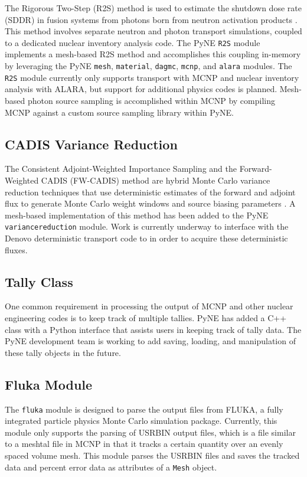 \documentclass{anstrans}
\newcommand{\Mesh}{\texttt{Mesh} }
\begin{document}
The Rigorous Two-Step (R2S) method is used to estimate the shutdown dose rate
(SDDR) in fusion systems from photons born from neutron activation products
\cite{chen_rigorous_2002}. This method involves separate neutron and photon
transport simulations, coupled to a dedicated nuclear inventory analysis code.
The PyNE \texttt{R2S} module implements a mesh-based R2S method and
accomplishes this coupling in-memory by leveraging the PyNE \texttt{mesh},
\texttt{material}, \texttt{dagmc}, \texttt{mcnp}, and \texttt{alara} modules.
The \texttt{R2S} module currently only supports transport with MCNP and nuclear
inventory analysis with ALARA, but support for additional physics codes is
planned. Mesh-based photon source sampling is accomplished within MCNP by
compiling MCNP against a custom source sampling library within PyNE.


\subsection{CADIS Variance Reduction}

The Consistent Adjoint-Weighted Importance Sampling and the
Forward-Weighted CADIS (FW-CADIS) method are hybrid Monte Carlo variance reduction
techniques that use deterministic estimates of the forward and adjoint flux to
generate Monte Carlo weight windows and source biasing parameters
\cite{haghighat_monte_2003}. A mesh-based implementation of this method has
been added to the PyNE \texttt{variancereduction} module. Work is currently
underway to interface with the Denovo \cite{Evans2010} deterministic transport
code to in order to acquire these deterministic fluxes.


\subsection{Tally Class}

One common requirement in processing the output of MCNP and other nuclear
engineering codes is to keep track of multiple tallies. PyNE has added a
C++ class with a Python interface that assists users in keeping track of
tally data. The PyNE development team is working to add saving, loading,
and manipulation of these tally objects in the future.

\subsection{Fluka Module}

The \texttt{fluka} module is designed to parse the output files from FLUKA, a fully 
integrated particle physics Monte Carlo simulation package\cite{fluka07}. Currently, 
this module only supports the parsing of USRBIN output files, which is 
a file similar to a meshtal file in MCNP in that it tracks a certain 
quantity over an evenly spaced volume mesh. This module parses the USRBIN 
files and saves the tracked data and percent error data as attributes of 
a \Mesh object.
\end{document}
